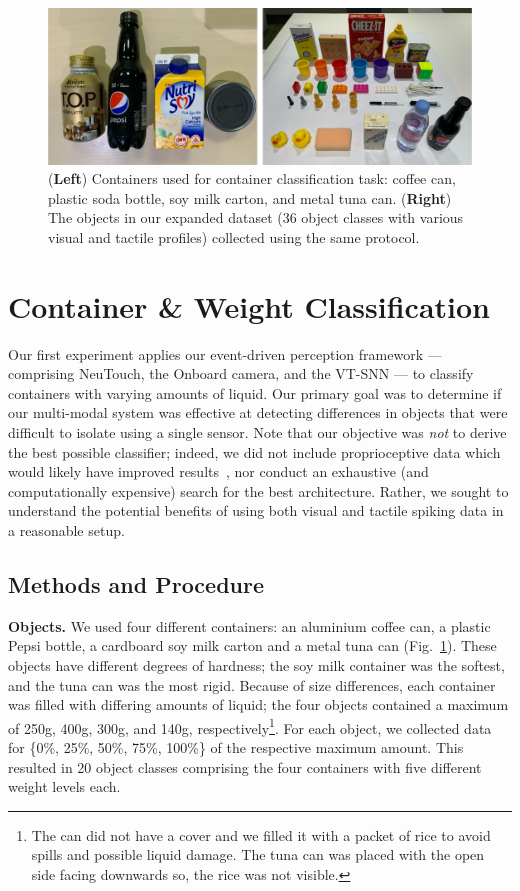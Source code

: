 \documentclass[fyp]{socreport}
\begin{document}
\begin{figure}
\centering
\includegraphics[width=0.87\columnwidth]{images/robotsetup/objects_exp1_small.png}
\caption{(\textbf{Left}) Containers used for container classification task:
  coffee can, plastic soda bottle, soy milk carton, and metal tuna can.
  (\textbf{Right}) The objects in our expanded dataset ($36$ object classes with
  various visual and tactile profiles) collected using the same
  protocol.\label{fig:expobjects}}
\end{figure}

\section{Container \& Weight Classification\label{sec:container_class}}

Our first experiment applies our event-driven perception framework ---
comprising NeuTouch, the Onboard camera, and the VT-SNN --- to classify
containers with varying amounts of liquid. Our primary goal was to determine if
our multi-modal system was effective at detecting differences in objects that
were difficult to isolate using a single sensor. Note that our objective was
\emph{not} to derive the {best possible classifier}; indeed, we did not include
proprioceptive data which would likely have improved
results~\cite{lee2019making}, nor conduct an exhaustive (and computationally
expensive) search for the best architecture. Rather, we sought to understand the
potential benefits of using both visual and tactile spiking data in a reasonable
setup.

\subsection{Methods and Procedure}

\noindent\textbf{Objects.} We used four different containers: an aluminium
coffee can, a plastic Pepsi bottle, a cardboard soy milk carton and a metal tuna
can (Fig.~\ref{fig:expobjects}). These objects have different degrees of
hardness; the soy milk container was the softest, and the tuna can was the most
rigid. Because of size differences, each container was filled with differing
amounts of liquid; the four objects contained a maximum of 250g, 400g, 300g, and
140g, respectively\footnote{The can did not have a cover and we filled it with a
  packet of rice to avoid spills and possible liquid damage. The tuna can was
  placed with the open side facing downwards so, the rice was not visible.}. For
each object, we collected data for \{0\%, 25\%, 50\%, 75\%, 100\%\} of the
respective maximum amount. This resulted in 20 object classes comprising the
four containers with five different weight levels each.
\end{document}
